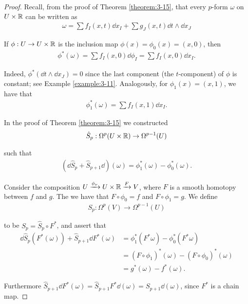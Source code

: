 \begin{proof}
Recall, from the proof of Theorem \ref{theorem:3-15}, that every $p$-form $\omega$ on $U\times{\ensuremath{\mathbb{R}}}$
can be written as
\begin{align*}
  \omega = \sum f_I(x, t)\dd x_I + \sum g_J(x, t)\dd t\wedge\dd x_J
\end{align*}

If $\phi:U\to U\times{\ensuremath{\mathbb{R}}}$ is the inclusion map $\phi(x) = \phi_0(x) = (x, 0)$, then 
\begin{align*}
  \phi^*(\omega) = \sum f_I(x, 0)\dd \phi_I = \sum f_I(x, 0)\dd x_I.
\end{align*}

Indeed, $\phi^*(\!\dd t\wedge\dd x_J) = 0$ since the last component (the $t$-component) of $\phi$ is
constant; see Example \ref{example:3-11}. Analogously, for $\phi_1(x) = (x, 1)$, we have that
\begin{align*}
  \phi^*_1(\omega) = \sum f_I(x, 1)\dd x_I.
\end{align*}

In the proof of Theorem \ref{theorem:3-15} we constructed
\begin{align*}
  \hat{S}_p: \Omega^p(U\times{\ensuremath{\mathbb{R}}})\to \Omega^{p-1}(U)
\end{align*}

such that 
\begin{align}
  (\!\dd\hat{S}_p + \hat{S}_{p+1}\dd)(\omega) = \phi^*_1(\omega) - \phi^*_0(\omega).
\end{align}

Consider the composition $U\xra[\phi_\nu]U\times\RR\xra[F] V$, where $F$ is a smooth homotopy between 
$f$ and $g$. The we have that $F\circ\phi_0 = f$ and $F\circ\phi_1 = g$. We define 
\begin{align*}
  S_p:\Omega^p(V)\to \Omega^{p-1}(U)
\end{align*}

to be $S_p = \hat{S}_p\circ F^*$, and assert that 
\begin{align*}
  \dd\hat{S}_p(F^*(\omega)) + \hat{S}_{p+1}\dd F^*(\omega)
  & = \phi_1^*(F^*\omega) - \phi_0^*(F^*\omega) \\
  & = (F\circ\phi_1)^*(\omega) - (F\circ\phi_0)^*(\omega) \\
  & = g^*(\omega) - f^*(\omega).
\end{align*}

Furthermore $\hat{S}_{p+1}\dd F^*(\omega) = \hat{S}_{p+1}F^*\dd(\omega) = S_{p+1}\dd(\omega)$, since 
$F^*$ is a chain map.
\end{proof}

